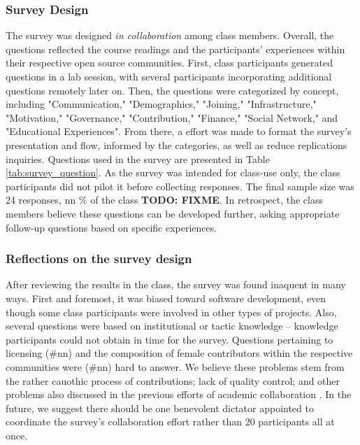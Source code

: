 \subsubsection{Survey Design}

The survey was designed {\it in collaboration} among class members. Overall, the questions reflected the course 
readings and the participants' experiences within their respective open source communities. First, class 
participants generated questions in a lab session, with several participants incorporating additional questions remotely later on. 
Then, the questions were categorized by concept, including "Communication," "Demographics," "Joining," "Infrastructure," "Motivation,"
"Governance," "Contribution," "Finance," "Social Network," and "Educational Experiences". From there, a effort was made to format the survey's 
presentation and flow, informed by the categories, as well as reduce replications inquiries. Questions used in the survey 
are presented in Table \ref{tab:survey_question}. As the survey was intended for class-use only, the class participants did not pilot it before collecting 
responses. The final sample size was 24 responses, nn \% of the class \textbf{TODO: FIXME}. In retrospect, the class members believe these questions can be 
developed further, asking appropriate follow-up questions based on specific experiences.

\subsubsection{Reflections on the survey design}

After reviewing the results in the class, the survey was found inaquent in many ways. First and foremost, it was biased 
toward software development, even though some class participants were involved in other types of projects. Also, several questions were based 
on institutional or tactic knowledge -- knowledge participants could not obtain in time for the survey. Questions pertaining to licensing (\#nn) and the composition 
of female contributors within the respective communities were (\#nn) hard to answer. We believe these problems stem from the rather cauothic process of contributions; 
lack of quality control; and other problems also discussed in the previous efforts of academic collaboration \cite{Tomlinson2012}. In the future, we suggest there should be 
one benevolent dictator appointed to coordinate the survey's collaboration effort rather than 20 participants all at once. 

